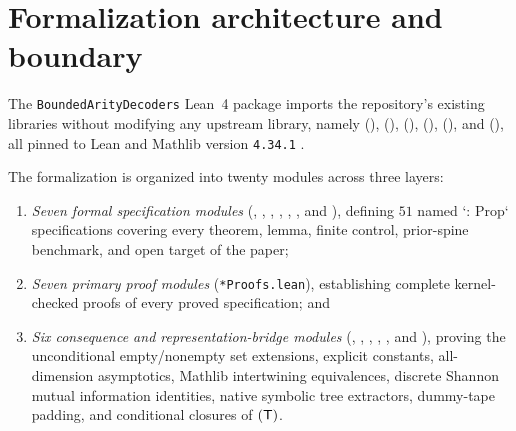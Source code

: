 \section{Formalization architecture and boundary}\label{sec:formalization}

The \texttt{BoundedArityDecoders} Lean~4 package imports the repository's existing libraries
without modifying any upstream library, namely  (\cite{FirstPaper2026}),
 (\cite{BoundedStack2026}), 
(\cite{HighRate2026}),  (\cite{SeventeenthPaper2026}),
 (\cite{AdaptiveTransfer2026}), and 
(\cite{SharedDecoders2026}), all pinned to Lean and Mathlib version \texttt{4.34.1}
\cite{Mathlib2026}.

The formalization is organized into twenty modules across three layers:
\begin{enumerate}[label=(\arabic*)]
\item \emph{Seven formal specification modules}
  (,
  ,
  ,
  ,
  ,
  , and
  ), defining $51$ named `: Prop` specifications covering every
  theorem, lemma, finite control, prior-spine benchmark, and open target of the paper;
\item \emph{Seven primary proof modules} (\texttt{*Proofs.lean}), establishing complete
  kernel-checked proofs of every proved specification; and
\item \emph{Six consequence and representation-bridge modules}
  (,
  ,
  ,
  ,
  , and
  ), proving the unconditional empty/nonempty set
  extensions, explicit constants, all-dimension asymptotics, Mathlib 
  intertwining equivalences, discrete Shannon mutual information identities, native
   symbolic tree extractors, dummy-tape padding, and conditional closures of
  $(\mathsf{T})$.
\end{enumerate}

